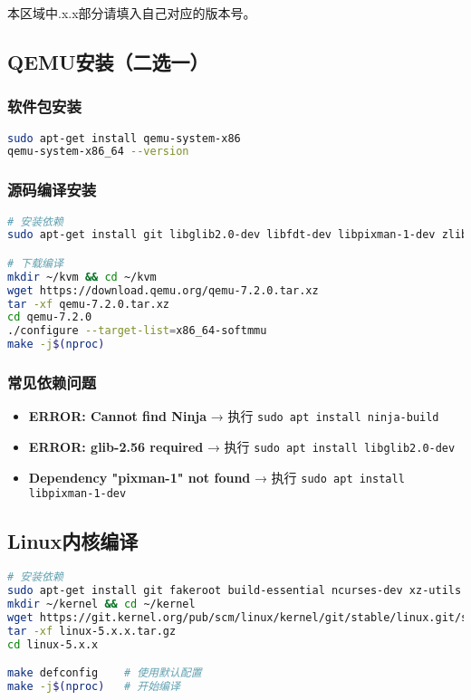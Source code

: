 \begin{remark}
    本区域中.x.x部分请填入自己对应的版本号。
\end{remark}



\subsection{QEMU安装（二选一）}
\subsubsection{软件包安装}
\begin{lstlisting}[language=bash]
sudo apt-get install qemu-system-x86
qemu-system-x86_64 --version
\end{lstlisting}

\subsubsection{源码编译安装}
\begin{lstlisting}[language=bash]
# 安装依赖
sudo apt-get install git libglib2.0-dev libfdt-dev libpixman-1-dev zlib1g-dev ninja-build

# 下载编译
mkdir ~/kvm && cd ~/kvm
wget https://download.qemu.org/qemu-7.2.0.tar.xz
tar -xf qemu-7.2.0.tar.xz
cd qemu-7.2.0
./configure --target-list=x86_64-softmmu
make -j$(nproc)
\end{lstlisting}

\subsubsection{常见依赖问题}
\begin{itemize}
    \item \textbf{ERROR: Cannot find Ninja} → 执行 \texttt{sudo apt install ninja-build}
    \item \textbf{ERROR: glib-2.56 required} → 执行 \texttt{sudo apt install libglib2.0-dev}
    \item \textbf{Dependency "pixman-1" not found} → 执行 \texttt{sudo apt install libpixman-1-dev}
\end{itemize}

\subsection{Linux内核编译}
\begin{lstlisting}[language=bash]
# 安装依赖
sudo apt-get install git fakeroot build-essential ncurses-dev xz-utils libssl-dev bc flex libelf-dev bison
mkdir ~/kernel && cd ~/kernel
wget https://git.kernel.org/pub/scm/linux/kernel/git/stable/linux.git/snapshot/linux-5.x.x.tar.gz
tar -xf linux-5.x.x.tar.gz
cd linux-5.x.x

make defconfig    # 使用默认配置
make -j$(nproc)   # 开始编译
\end{lstlisting}

